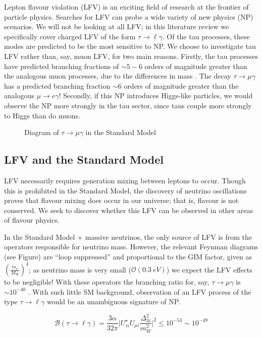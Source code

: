 \documentclass[12pt,a4paper]{article} %
\newcommand{\tmg}{\tau\to\mu\gamma}
\newcommand{\tlg}{\tau\to\ell\gamma}
\begin{document}
Lepton flavour violation (LFV) is an exciting field of research at the frontier of particle physics. Searches for LFV can probe a wide variety of new physics (NP) scenarios. We will not be looking at all LFV; in this literature review we specifically cover charged LFV of the form $\tlg$. Of the tau processes, these modes are predicted to be the most sensitive to NP. We choose to investigate tau LFV rather than, say, muon LFV, for two main reasons. Firstly, the tau processes have predicted branching fractions of $\sim 5 - 6$ orders of magnitude greater than the analogous muon processes, due to the differences in mass \cite{Paradisi:2016}. The decay $\tmg$ has a predicted branching fraction $\sim 6$ orders of magnitude greater than the analogous $\mu\to e \gamma$! Secondly, if this NP introduces Higgs-like particles, we would observe the NP more strongly in the tau sector, since taus couple more strongly to Higgs than do muons.


\begin{figure}[h]
\centering
\caption{Diagram of $\tmg$ in the Standard Model}
\label{}
\end{figure}

\subsection{LFV and the Standard Model}

LFV necessarily requires generation mixing between leptons to occur. Though this is prohibited in the Standard Model, the discovery of neutrino oscillations proves that flavour mixing does occur in our universe; that is, flavour is not conserved. We seek to discover whether this LFV can be observed in other areas of flavour physics.

In the Standard Model + massive neutrinos, the only source of LFV is from the operators responsible for neutrino mass. However, the relevant Feynman diagrams (see Figure) are ``loop suppressed'' and proportional to the GIM factor, given as $\left(\frac{m_\nu}{M_W}\right)^4$; as neutrino mass is very small ($\mathcal{O}(\SI{0.3}{eV})$) we expect the LFV effects to be negligible! With these operators the branching ratio for, say, $\tmg$ is $\sim 10^{-40}$ \cite{Passemar:2015}. With such little SM background, observation of an LFV process of the type $\tlg$ would be an unambiguous signature of NP.

\begin{equation}
\mathcal{B}(\tau\to\ell\gamma)=\frac{3\alpha}{32\pi}\lvert U^{\star}_{\tau i} U_{\mu i}\frac{\Delta^2_{3i}}{m_W^2}\rvert^2
\leq 10^{-53}\sim 10^{-49}
\end{equation}
\end{document}

